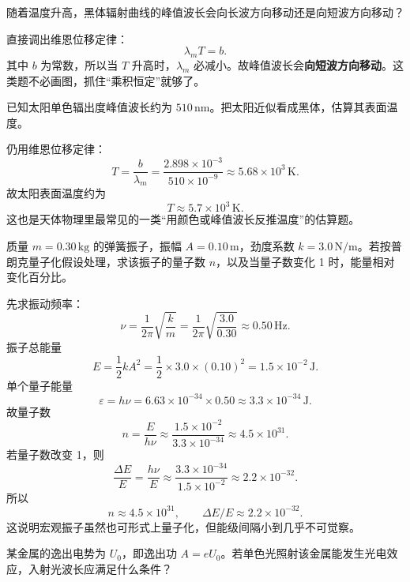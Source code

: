 \documentclass[lang=cn,11pt]{elegantbook}
\begin{document}
\begin{example}[黑体温度升高时峰值波长向哪边移动]
随着温度升高，黑体辐射曲线的峰值波长会向长波方向移动还是向短波方向移动？
\end{example}

\begin{solution}
直接调出维恩位移定律：
\[
\lambda_m T=b.
\]
其中 \(b\) 为常数，所以当 \(T\) 升高时，\(\lambda_m\) 必减小。故峰值波长会\textbf{向短波方向移动}。这类题不必画图，抓住“乘积恒定”就够了。
\end{solution}

\begin{example}[由太阳峰值波长估算表面温度]
已知太阳单色辐出度峰值波长约为 \(510\,\mathrm{nm}\)。把太阳近似看成黑体，估算其表面温度。
\end{example}

\begin{solution}
仍用维恩位移定律：
\[
T=\frac{b}{\lambda_m}
=\frac{2.898\times 10^{-3}}{510\times 10^{-9}}
\approx 5.68\times 10^3\,\mathrm{K}.
\]
故太阳表面温度约为
\[
\boxed{T\approx 5.7\times 10^3\,\mathrm{K}.}
\]
这也是天体物理里最常见的一类“用颜色或峰值波长反推温度”的估算题。
\end{solution}

\begin{example}[宏观弹簧振子的量子数为何巨大]
质量 \(m=0.30\,\mathrm{kg}\) 的弹簧振子，振幅 \(A=0.10\,\mathrm{m}\)，劲度系数 \(k=3.0\,\mathrm{N/m}\)。若按普朗克量子化假设处理，求该振子的量子数 \(n\)，以及当量子数变化 1 时，能量相对变化百分比。
\end{example}

\begin{solution}
先求振动频率：
\[
\nu=\frac{1}{2\pi}\sqrt{\frac{k}{m}}
=\frac{1}{2\pi}\sqrt{\frac{3.0}{0.30}}
\approx 0.50\,\mathrm{Hz}.
\]
振子总能量
\[
E=\frac12 kA^2
=\frac12\times 3.0\times (0.10)^2
=1.5\times 10^{-2}\,\mathrm{J}.
\]
单个量子能量
\[
\varepsilon=h\nu
=6.63\times 10^{-34}\times 0.50
\approx 3.3\times 10^{-34}\,\mathrm{J}.
\]
故量子数
\[
n=\frac{E}{h\nu}
\approx \frac{1.5\times 10^{-2}}{3.3\times 10^{-34}}
\approx 4.5\times 10^{31}.
\]
若量子数改变 1，则
\[
\frac{\Delta E}{E}=\frac{h\nu}{E}
\approx \frac{3.3\times 10^{-34}}{1.5\times 10^{-2}}
\approx 2.2\times 10^{-32}.
\]
所以
\[
\boxed{n\approx 4.5\times 10^{31},\qquad \Delta E/E\approx 2.2\times 10^{-32}.}
\]
这说明宏观振子虽然也可形式上量子化，但能级间隔小到几乎不可觉察。
\end{solution}

\begin{example}[发生光电效应时波长必须满足什么条件]
某金属的逸出电势为 \(U_0\)，即逸出功 \(A=eU_0\)。若单色光照射该金属能发生光电效应，入射光波长应满足什么条件？
\end{example}
\end{document}
